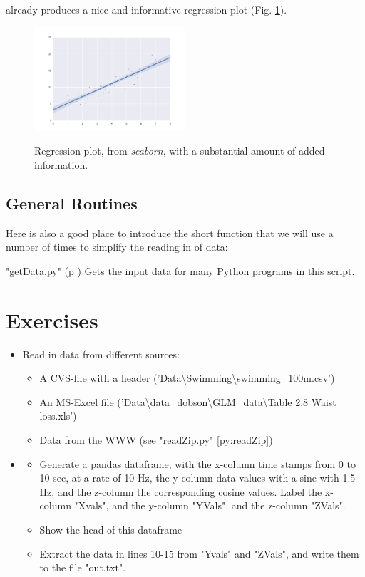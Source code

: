 already produces a nice and informative regression plot (Fig. \ref{fig:seaborn}).

\begin{figure}[ht]
  \centering
  \includegraphics[width=0.5\textwidth]{../Images/regplot.png}\\
  \caption{Regression plot, from \emph{seaborn}, with a substantial amount of added information.}
  \label{fig:seaborn}
\end{figure}

\subsection{General Routines}
Here is also a good place to introduce the short function that we will use a number of times to simplify the reading in of data:

\PyImg "getData.py" (p \pageref{py:getData}) Gets the input data for many Python programs in this script.

\section{Exercises}

\begin{itemize}
  \item Read in data from different sources:
  \begin{itemize}
    \item A CVS-file with a header ('Data\textbackslash Swimming\textbackslash swimming\_100m.csv')
    \item An MS-Excel file ('Data\textbackslash data\_dobson\textbackslash GLM\_data\textbackslash Table 2.8 Waist loss.xls')
    \item Data from the WWW (see "readZip.py" \ref{py:readZip})
  \end{itemize}
  \item
  \begin{itemize}
      \item Generate a pandas dataframe, with the x-column time stamps from 0 to 10 sec, at a rate of 10 Hz, the y-column data values with a sine with 1.5 Hz, and the z-column the corresponding cosine values. Label the x-column "Xvals", and the y-column "YVals", and the z-column "ZVals".
      \item Show the head of this dataframe
      \item Extract the data in lines 10-15 from "Yvals" and "ZVals", and write them to the file "out.txt".
  \end{itemize}
\end{itemize}

